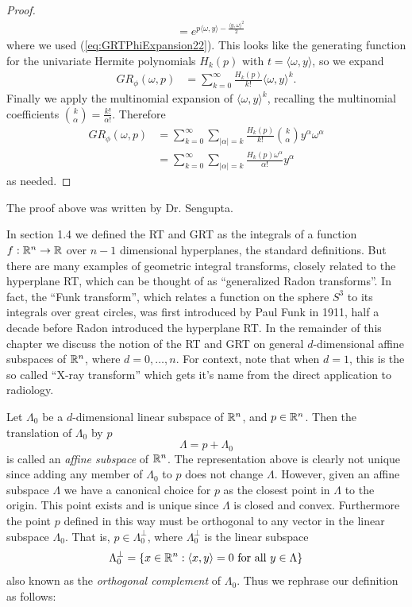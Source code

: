 \begin{proof}
\begin{align*}
      &= e^{p \langle \omega, y\rangle - \frac{\langle y, \omega\rangle^2}2}
  \end{align*}
  where we used (\ref{eq:GRTPhiExpansion22}). This looks like the generating function for the univariate Hermite polynomials $H_k(p)$ with $t = \langle \omega, y \rangle$, so we expand
  \begin{align*}
    GR_{\phi}(\omega, p) 
      &= \sum_{k = 0}^\infty \frac{H_k(p)}{k!} \langle \omega, y\rangle^k.
  \end{align*}
  Finally we apply the multinomial expansion of $\langle \omega, y\rangle^k$, recalling the multinomial coefficients $\binom{k}{\alpha} = \frac{k!}{\alpha!}$. Therefore
  \begin{align*}
    GR_{\phi}(\omega, p)
      &= \sum_{k = 0}^\infty \sum_{|\alpha| = k} \frac{H_k(p)}{k!} \binom{k}\alpha y^\alpha\omega^\alpha
    \\
      &= \sum_{k = 0}^\infty \sum_{|\alpha| = k} \frac{H_k(p)\omega^\alpha}{\alpha!} y^\alpha
  \end{align*}
  as needed.
\end{proof}

\begin{remark}
  The proof above was written by Dr. Sengupta.
\end{remark}

In section 1.4 we defined the RT and GRT as the integrals of a function $f: \mathbb{R}^n \rightarrow \mathbb{R}$ over $n-1$ dimensional hyperplanes, the standard definitions. But there are many examples of geometric integral transforms, closely related to the hyperplane RT, which can be thought of as ``generalized Radon transforms''. In fact, the ``Funk transform'', which relates a function on the sphere $S^{3}$ to its integrals over great circles, was first introduced by Paul Funk in 1911, half a decade before Radon introduced the hyperplane RT. In the remainder of this chapter we discuss the notion of the RT and GRT on general $d$-dimensional affine subspaces of $\mathbb{R}^n$, where $d = 0, \ldots, n$. For context, note that when $d = 1$, this is the so called ``X-ray transform'' which gets it's name from the direct application to radiology.

Let $\Lambda_0$ be a $d$-dimensional linear subspace of $\mathbb{R}^n$, and $p \in \mathbb{R}^n$. Then the translation of $\Lambda_0$ by $p$
\[
  \Lambda = p + \Lambda_0
\]
is called an \emph{affine subspace} of $\mathbb{R}^n$. The representation above is clearly not unique since adding any member of $\Lambda_0$ to $p$ does not change $\Lambda$. However, given an affine subspace $\Lambda$ we have a canonical choice for $p$ as the closest point in $\Lambda$ to the origin. This point exists and is unique since $\Lambda$ is closed and convex. Furthermore the point $p$ defined in this way must be orthogonal to any vector in the linear subspace $\Lambda_0$. That is, $p \in \Lambda_0^\perp$, where $\Lambda_0^\perp$ is the linear subspace
\[
  \Lambda_0^\perp = \{x \in \mathbb{R}^n : \langle x, y \rangle = 0 \text{ for all } y \in \Lambda\}
\]
also known as the \emph{orthogonal complement} of $\Lambda_0$. Thus we rephrase our definition as follows:

